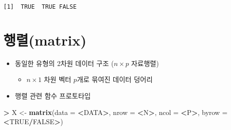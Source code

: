 \documentclass[11pt,a4paper]{book}
\newenvironment{Shaded}{\begin{snugshade}}{\end{snugshade}}
\newcommand{\KeywordTok}[1]{\textcolor[rgb]{0.13,0.29,0.53}{\textbf{#1}}}
\newcommand{\DataTypeTok}[1]{\textcolor[rgb]{0.13,0.29,0.53}{#1}}
\newcommand{\StringTok}[1]{\textcolor[rgb]{0.31,0.60,0.02}{#1}}
\newcommand{\OtherTok}[1]{\textcolor[rgb]{0.56,0.35,0.01}{#1}}
\newcommand{\OperatorTok}[1]{\textcolor[rgb]{0.81,0.36,0.00}{\textbf{#1}}}
\newcommand{\NormalTok}[1]{#1}
\providecommand{\tightlist}{%
  \setlength{\itemsep}{0pt}\setlength{\parskip}{0pt}}
\theoremstyle{definition}
\theoremstyle{definition}
\theoremstyle{definition}
\theoremstyle{remark}
\begin{document}
\begin{Shaded}
\end{Shaded}

\begin{verbatim}
[1]  TRUE  TRUE FALSE
\end{verbatim}

\normalsize

\section{행렬(matrix)}\label{matrix}

\begin{itemize}
\tightlist
\item
  동일한 유형의 2차원 데이터 구조 (\(n \times p\) 자료행렬)

  \begin{itemize}
  \tightlist
  \item
    \(n \times 1\) 차원 벡터 \(p\)개로 묶여진 데이터 덩어리
  \end{itemize}
\item
  행렬 관련 함수 프로토타입
\end{itemize}

\footnotesize

\begin{Shaded}
\begin{Highlighting}[]
\OperatorTok{>}\StringTok{ }\NormalTok{X <-}\StringTok{ }\KeywordTok{matrix}\NormalTok{(}\DataTypeTok{data =} \OperatorTok{<}\NormalTok{DATA}\OperatorTok{>}\NormalTok{, }\DataTypeTok{nrow =} \OperatorTok{<}\NormalTok{N}\OperatorTok{>}\NormalTok{, }\DataTypeTok{ncol =} \OperatorTok{<}\NormalTok{P}\OperatorTok{>}\NormalTok{, }\DataTypeTok{byrow =} \OperatorTok{<}\OtherTok{TRUE}\OperatorTok{/}\OtherTok{FALSE}\OperatorTok{>}\NormalTok{)}
\end{Highlighting}
\end{Shaded}

\normalsize
\end{document}
